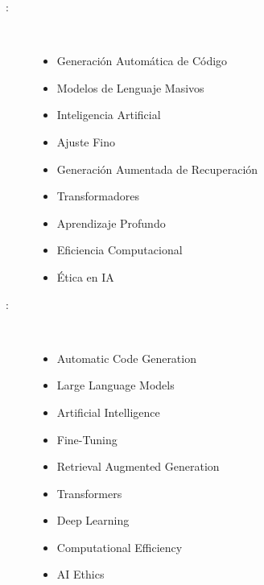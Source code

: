 \newpage  %
\begin{multicols}{2}
\begin{description}
\item [\palabraschaveprincipal:] \mbox{} \\[-20pt]
\begin{itemize}
    \item Generación Automática de Código
    \item Modelos de Lenguaje Masivos
    \item Inteligencia Artificial
    \item Ajuste Fino
    \item Generación Aumentada de Recuperación 
    \item Transformadores
    \item Aprendizaje Profundo
    \item Eficiencia Computacional
    \item Ética en IA
\end{itemize}
\end{description}
\begin{description}
\item [\palabraschavesecundaria:] \mbox{} \\[-20pt]
\begin{itemize}
    \item Automatic Code Generation
    \item Large Language Models
    \item Artificial Intelligence
    \item Fine-Tuning
    \item Retrieval Augmented Generation
    \item Transformers
    \item Deep Learning
    \item Computational Efficiency
    \item AI Ethics
\end{itemize}
\end{description}
\end{multicols}
